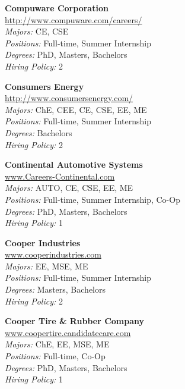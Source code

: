 \documentclass[twoside]{article}
\begin{document}
\begin{center}
\begin{multicols}{3}
\begin{minipage}{.9\columnwidth}{\Large\bf Compuware Corporation }\\
	\url{http://www.compuware.com/careers/}\\
	\emph{Majors:} CE, CSE\\
	\emph{Positions:} Full-time, Summer Internship\\
	\emph{Degrees:} PhD, Masters, Bachelors\\
	\emph{Hiring Policy:} 2\\
\end{minipage}
 
\begin{minipage}{.9\columnwidth}{\Large\bf Consumers Energy }\\
	\url{http://www.consumersenergy.com/}\\
	\emph{Majors:} ChE, CEE, CE, CSE, EE, ME\\
	\emph{Positions:} Full-time, Summer Internship\\
	\emph{Degrees:} Bachelors\\
	\emph{Hiring Policy:} 2\\
\end{minipage}
 
\begin{minipage}{.9\columnwidth}{\Large\bf Continental Automotive Systems }\\
	\url{www.Careers-Continental.com}\\
	\emph{Majors:} AUTO, CE, CSE, EE, ME\\
	\emph{Positions:} Full-time, Summer Internship, Co-Op\\
	\emph{Degrees:} PhD, Masters, Bachelors\\
	\emph{Hiring Policy:} 1\\
\end{minipage}
 
\begin{minipage}{.9\columnwidth}{\Large\bf Cooper Industries }\\
	\url{www.cooperindustries.com}\\
	\emph{Majors:} EE, MSE, ME\\
	\emph{Positions:} Full-time, Summer Internship\\
	\emph{Degrees:} Masters, Bachelors\\
	\emph{Hiring Policy:} 2\\
\end{minipage}
 
\begin{minipage}{.9\columnwidth}{\Large\bf Cooper Tire \& Rubber Company }\\
	\url{www.coopertire.candidatecare.com}\\
	\emph{Majors:} ChE, EE, MSE, ME\\
	\emph{Positions:} Full-time, Co-Op\\
	\emph{Degrees:} PhD, Masters, Bachelors\\
	\emph{Hiring Policy:} 1\\
\end{minipage}
 

\end{multicols}
\end{center}
\end{document}
